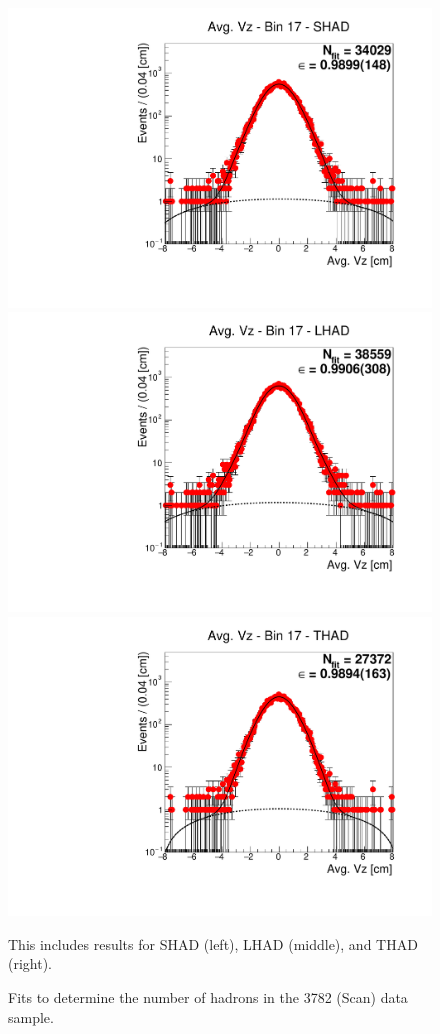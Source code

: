 \begin{figure}[H]
\centering
\includegraphics[scale=0.25]{figures/plots/nonDDbar_fit_results/scan/fit_scan_17_data_SHAD.pdf}
\hspace{-0.5cm}
\includegraphics[scale=0.25]{figures/plots/nonDDbar_fit_results/scan/fit_scan_17_data_LHAD.pdf}
\hspace{-0.5cm}
\includegraphics[scale=0.25]{figures/plots/nonDDbar_fit_results/scan/fit_scan_17_data_THAD.pdf}
\caption{Fits to determine the number of hadrons in the 3782 (Scan) data sample.}
{This includes results for SHAD (left), LHAD (middle), and THAD (right).}
\label{fig:hadron_fits_scan_17}
\end{figure}

